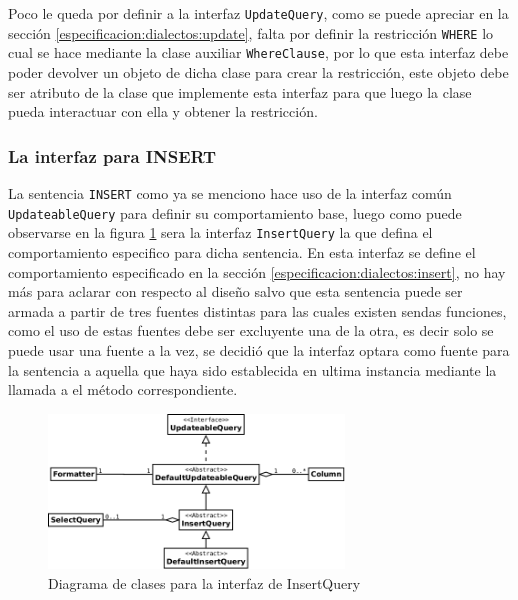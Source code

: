 Poco le queda por definir a la interfaz \verb=UpdateQuery=, como se puede apreciar en la sección \ref{especificacion:dialectos:update}, falta por definir la restricción \verb=WHERE= lo cual se hace mediante la clase auxiliar \verb=WhereClause=, por lo que esta interfaz debe poder devolver un objeto de dicha clase para crear la restricción, este objeto debe ser atributo de la clase que implemente esta interfaz para que luego la clase pueda interactuar con ella y obtener la restricción. 
%
\subsubsection{La interfaz para INSERT}
La sentencia \verb=INSERT= como ya se menciono hace uso de la interfaz común \verb=UpdateableQuery= para definir su comportamiento base, luego como puede observarse en la figura \ref{fig:dc-insertquery} sera la interfaz \verb=InsertQuery= la que defina el comportamiento especifico para dicha sentencia. En esta interfaz se define el comportamiento especificado en la sección \ref{especificacion:dialectos:insert}, no hay más para aclarar con respecto al diseño salvo que esta sentencia puede ser armada a partir de tres fuentes distintas para las cuales existen sendas funciones, como el uso de estas fuentes debe ser excluyente una de la otra, es decir solo se puede usar una fuente a la vez, se decidió que la interfaz optara como fuente para la sentencia a aquella que haya sido establecida en ultima instancia mediante la llamada a el método correspondiente.
%
\begin{figure}[h]
  \centering
    \includegraphics[width=0.7\textwidth]{figuras/jdbgm-dc-insert.png}
  \caption{Diagrama de clases para la interfaz de InsertQuery}
  \label{fig:dc-insertquery}
\end{figure}
%
